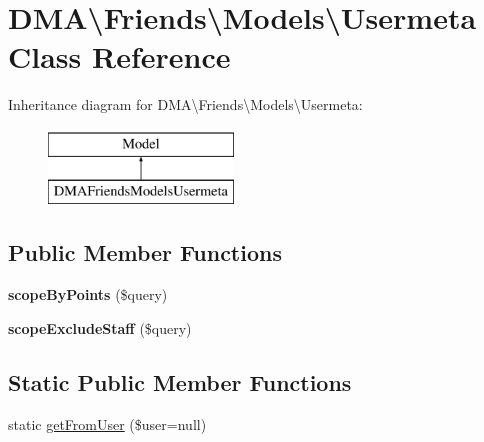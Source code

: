 \hypertarget{classDMA_1_1Friends_1_1Models_1_1Usermeta}{\section{D\+M\+A\textbackslash{}Friends\textbackslash{}Models\textbackslash{}Usermeta Class Reference}
\label{classDMA_1_1Friends_1_1Models_1_1Usermeta}
}
Inheritance diagram for D\+M\+A\textbackslash{}Friends\textbackslash{}Models\textbackslash{}Usermeta\+:\begin{figure}[H]
\begin{center}
\leavevmode
\includegraphics[height=2.000000cm]{d6/d87/classDMA_1_1Friends_1_1Models_1_1Usermeta}
\end{center}
\end{figure}
\subsection*{Public Member Functions}
\begin{DoxyCompactItemize}
\item 
\hypertarget{classDMA_1_1Friends_1_1Models_1_1Usermeta_ae00ecaf0d62b1ac7adc77184ae2fcbfa}{{\bfseries scope\+By\+Points} (\$query)}\label{classDMA_1_1Friends_1_1Models_1_1Usermeta_ae00ecaf0d62b1ac7adc77184ae2fcbfa}

\item 
\hypertarget{classDMA_1_1Friends_1_1Models_1_1Usermeta_a9b2ffa9c768ce6346269295d54d5cf4b}{{\bfseries scope\+Exclude\+Staff} (\$query)}\label{classDMA_1_1Friends_1_1Models_1_1Usermeta_a9b2ffa9c768ce6346269295d54d5cf4b}

\end{DoxyCompactItemize}
\subsection*{Static Public Member Functions}
\begin{DoxyCompactItemize}
\item 
static \hyperlink{classDMA_1_1Friends_1_1Models_1_1Usermeta_a9cfb688f15d66ee5a34c6437316d5d71}{get\+From\+User} (\$user=null)
\end{DoxyCompactItemize}
